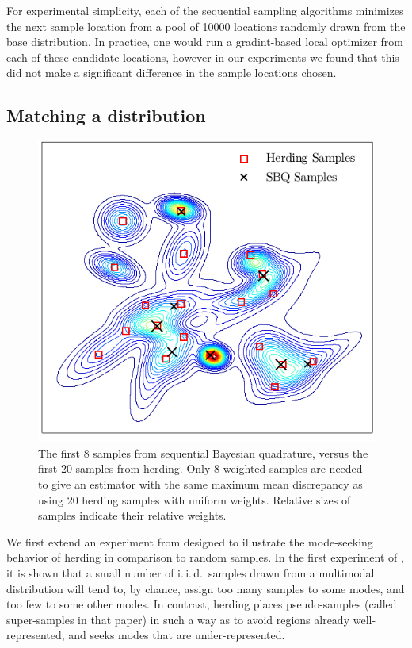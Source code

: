 For experimental simplicity, each of the sequential sampling algorithms minimizes the next sample location from a pool of 10000 locations randomly drawn from the base distribution. In practice, one would run a gradint-based local optimizer from each of these candidate locations, however in our experiments we found that this did not make a significant difference in the sample locations chosen. 

\subsection{Matching a distribution}

\begin{figure}[h]
\centering
\includegraphics[width=.8\columnwidth]{figs/herding/fig1_v2}
\caption[Sequential Bayesian quadrature versus kernel herding]{The first 8 samples from sequential Bayesian quadrature, versus the first 20 samples from herding. Only 8 weighted \sbq{} samples are needed to give an estimator with the same maximum mean discrepancy as using 20 herding samples with uniform weights. Relative sizes of samples indicate their relative weights.\label{fig:fig1}}
\end{figure} 

We first extend an experiment from \citep{chen2010super} designed to illustrate the mode-seeking behavior of herding in comparison to random samples. In the first experiment of \citep{chen2010super}, it is shown that a small number of i.\,i.\,d.\ samples drawn from a multimodal distribution will tend to, by chance, assign too many samples to some modes, and too few to some other modes. In contrast, herding places pseudo-samples (called super-samples in that paper) in such a way as to avoid regions already well-represented, and seeks modes that are under-represented.

